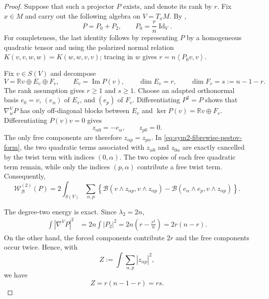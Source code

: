 \documentclass[reqno,11pt]{amsart}
\theoremstyle{definition}
\newcommand{\cB}{\mathcal B}
\newcommand{\Id}{\operatorname{Id}}
\newcommand{\bbR}{\mathbb R}
\newcommand{\inner}[2]{\left\langle #1,#2\right\rangle}
\begin{document}
\begin{proof}
Suppose that such a projector $P$ exists, and denote its rank by $r$.
Fix $x\in M$ and carry out the following algebra on $V=T_xM$.  By
\cite[Lemma~4.2]{CLMS24},
\begin{equation*}
  P=P_0+P_2,
  \qquad
  P_0=\frac rn\Id_V.
\end{equation*}
For completeness, the last identity follows by representing $P$ by a
homogeneous quadratic tensor and using the polarized normal relation
$K(v,v,w,w)=K(w,w,v,v)$; tracing in $w$ gives
$r=n\inner{P_0v}{v}$.

Fix $v\in S(V)$ and decompose
$$
 V=\bbR v\oplus E_v\oplus F_v,
 \qquad
 E_v=\operatorname{Im}P(v),
 \qquad
 \dim E_v=r,
 \qquad
 \dim F_v=s:=n-1-r.
$$
The rank assumption gives $r\geq1$ and $s\geq1$. Choose an adapted
orthonormal basis
$e_0=v$, $(e_\alpha)$ of $E_v$, and $(e_p)$ of $F_v$.  Differentiating
$P^2=P$ shows that $\nabla^V_wP$ has only off-diagonal blocks between
$E_v$ and $\ker P(v)=\bbR v\oplus F_v$. Differentiating $P(v)v=0$ gives
$$
  z_{\alpha0}=-e_\alpha,
  \qquad
  z_{p0}=0.
$$
The only free components are therefore $z_{\alpha p}=z_{p\alpha}$.  In
\eqref{eq:sym2-fibrewise-pestov-form}, the two quadratic terms associated with
$z_{\alpha0}$ and $z_{0\alpha}$ are exactly cancelled by the twist term
with indices $(0,\alpha)$.  The two copies of each free quadratic term
remain, while only the indices $(p,\alpha)$ contribute a free twist term.
Consequently,
\begin{equation}\label{eq:projector-exact-W}
 \mathscr W^{(2)}_{\cB}(P)
 =2\int_{S(V)}\sum_{\alpha,p}
 \left\{
  \cB(v\wedge z_{\alpha p},v\wedge z_{\alpha p})
  -\cB(e_\alpha\wedge e_p,v\wedge z_{\alpha p})
 \right\}.
\end{equation}

The degree-two energy is exact.  Since $\lambda_2=2n$,
\begin{align*}
 \int|\nabla^VP|^2
 &=2n\int|P_2|^2
 =2n\left(r-\frac{r^2}{n}\right)
 =2r(n-r).
\end{align*}
On the other hand, the forced components contribute $2r$ and the free
components occur twice. Hence, with
\begin{equation*}
 Z:=\int\sum_{\alpha,p}|z_{\alpha p}|^2,
\end{equation*}
we have
\begin{equation*}
  Z=r(n-1-r)=rs.
\end{equation*}


\end{proof}
\end{document}
